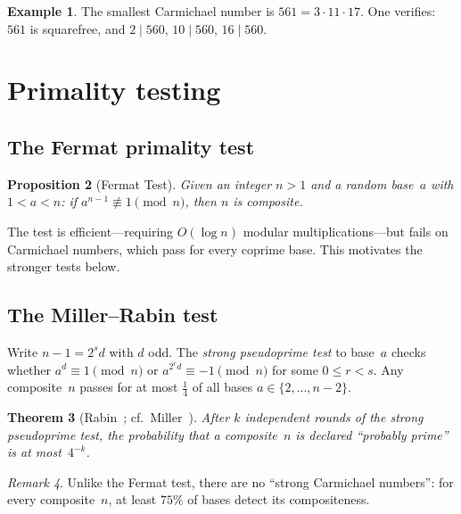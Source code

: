 \documentclass[12pt]{amsart}
\theoremstyle{plain}
\newtheorem{theorem}{Theorem}[section]
\newtheorem{proposition}[theorem]{Proposition}
\theoremstyle{definition}
\newtheorem{example}[theorem]{Example}
\theoremstyle{remark}
\newtheorem{remark}[theorem]{Remark}
\begin{document}
\begin{example}\label{ex:561}
The smallest Carmichael number is $561 = 3\cdot 11\cdot 17$.  One
verifies: $561$ is squarefree, and $2\mid 560$, $10\mid 560$,
$16\mid 560$.
\end{example}

\section{Primality testing}\label{sec:primality}

\subsection{The Fermat primality test}

\begin{proposition}[Fermat Test]\label{prop:fermat_test}
Given an integer $n>1$ and a random base~$a$ with $1<a<n$: if
$a^{n-1}\not\equiv 1\pmod{n}$, then $n$ is composite.
\end{proposition}

The test is efficient---requiring $O(\log n)$ modular
multiplications---but fails on Carmichael numbers, which pass for
every coprime base.  This motivates the stronger tests below.

\subsection{The Miller--Rabin test}

Write $n-1=2^{s}d$ with $d$ odd.  The \emph{strong pseudoprime test}
to base~$a$ checks whether $a^{d}\equiv 1\pmod{n}$ or $a^{2^{r}d}\equiv
-1\pmod{n}$ for some $0\le r<s$.  Any composite~$n$ passes for at most
$\frac{1}{4}$ of all bases $a\in\{2,\ldots,n-2\}$.

\begin{theorem}[Rabin~\cite{rabin1980}; cf.\ Miller~\cite{miller1976}]
\label{thm:millerrabin}
After $k$ independent rounds of the strong pseudoprime test, the
probability that a composite~$n$ is declared ``probably prime'' is at
most~$4^{-k}$.
\end{theorem}

\begin{remark}\label{rem:no_strong_carm}
Unlike the Fermat test, there are no ``strong Carmichael numbers'':
for every composite~$n$, at least $75\%$ of bases detect its
compositeness.
\end{remark}
\end{document}
